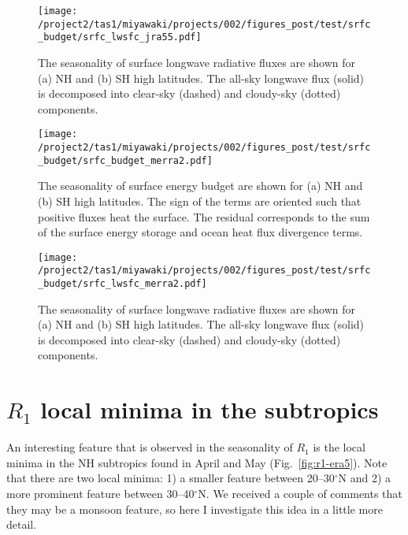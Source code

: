 \documentclass{article}
\begin{document}
\begin{figure}
    \texttt{[image: /project2/tas1/miyawaki/projects/002/figures\_post/test/srfc\_budget/srfc\_lwsfc\_jra55.pdf]}
    \caption{The seasonality of surface longwave radiative fluxes are shown for (a) NH and (b) SH high latitudes. The all-sky longwave flux (solid) is decomposed into  clear-sky (dashed) and cloudy-sky (dotted) components.}
    \label{fig:lwsfc-jra55}
\end{figure}

\begin{figure}
    \texttt{[image: /project2/tas1/miyawaki/projects/002/figures\_post/test/srfc\_budget/srfc\_budget\_merra2.pdf]}
    \caption{The seasonality of surface energy budget are shown for (a) NH and (b) SH high latitudes. The sign of the terms are oriented such that positive fluxes heat the surface. The residual corresponds to the sum of the surface energy storage and ocean heat flux divergence terms.}
    \label{fig:srfc-merra2}
\end{figure}

\begin{figure}
    \texttt{[image: /project2/tas1/miyawaki/projects/002/figures\_post/test/srfc\_budget/srfc\_lwsfc\_merra2.pdf]}
    \caption{The seasonality of surface longwave radiative fluxes are shown for (a) NH and (b) SH high latitudes. The all-sky longwave flux (solid) is decomposed into  clear-sky (dashed) and cloudy-sky (dotted) components.}
    \label{fig:lwsfc-merra2}
\end{figure}


\section{$R_1$ local minima in the subtropics}

An interesting feature that is observed in the seasonality of $R_1$ is the local minima in the NH subtropics found in April and May (Fig.~\ref{fig:r1-era5}). Note that there are two local minima: 1) a smaller feature between 20--30$^\circ$N and 2) a more prominent feature between 30--40$^\circ$N. We received a couple of comments that they may be a monsoon feature, so here I investigate this idea in a little more detail.
\end{document}
